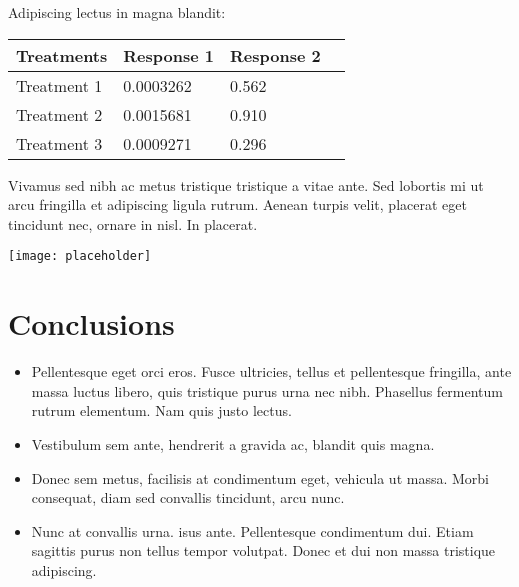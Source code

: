 \documentclass[a0,portrait]{a0poster}
\begin{document}
\begin{multicols}{2}
Adipiscing lectus in magna blandit:

\begin{center}\vspace{1cm}
\begin{tabular}{l l l l}
\toprule
\textbf{Treatments} & \textbf{Response 1} & \textbf{Response 2} \\
\midrule
Treatment 1 & 0.0003262 & 0.562 \\
Treatment 2 & 0.0015681 & 0.910 \\
Treatment 3 & 0.0009271 & 0.296 \\
\bottomrule
\end{tabular}
\end{center}\vspace{1cm}

Vivamus sed nibh ac metus tristique tristique a vitae ante. Sed lobortis mi ut arcu fringilla et adipiscing ligula rutrum. Aenean turpis velit, placerat eget tincidunt nec, ornare in nisl. In placerat.

\begin{center}\vspace{1cm}
\texttt{[image: placeholder]}
\end{center}\vspace{1cm}


\color{black} %

\section*{Conclusions}

\begin{itemize}
\item Pellentesque eget orci eros. Fusce ultricies, tellus et pellentesque fringilla, ante massa luctus libero, quis tristique purus urna nec nibh. Phasellus fermentum rutrum elementum. Nam quis justo lectus.
\item Vestibulum sem ante, hendrerit a gravida ac, blandit quis magna.
\item Donec sem metus, facilisis at condimentum eget, vehicula ut massa. Morbi consequat, diam sed convallis tincidunt, arcu nunc.
\item Nunc at convallis urna. isus ante. Pellentesque condimentum dui. Etiam sagittis purus non tellus tempor volutpat. Donec et dui non massa tristique adipiscing.
\end{itemize}


\end{multicols}
\end{document}
